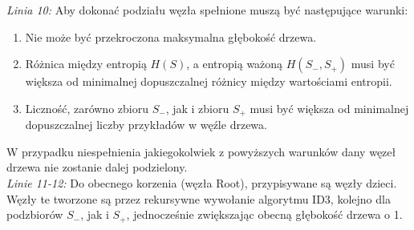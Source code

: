 \documentclass[
    left=2.5cm,         %
    right=2.5cm,        %
    top=2.5cm,          %
    bottom=3cm,         %
    bindingoffset=6mm,  %
    nohyphenation=false %
]{eiti/eiti-report}
\begin{document}
\textit{Linia 10:}
Aby dokonać podziału węzła spełnione muszą być następujące warunki:
\begin{enumerate}
    \item Nie może być przekroczona maksymalna głębokość drzewa.
    \item Różnica między entropią $H(S)$, a entropią ważoną $H(S_{-}, S_{+})$ musi być większa od minimalnej dopuszczalnej różnicy między wartościami entropii.
    \item Liczność, zarówno zbioru $S_{-}$, jak i zbioru $S_{+}$ musi być większa od minimalnej dopuszczalnej liczby przykładów w węźle drzewa.
\end{enumerate}
W przypadku niespełnienia jakiegokolwiek z powyższych warunków dany węzeł drzewa nie zostanie dalej podzielony.\\

\textit{Linie 11-12:}
Do obecnego korzenia (węzła Root), przypisywane są węzły dzieci. Węzły te tworzone są przez rekursywne wywołanie algorytmu ID3, kolejno dla podzbiorów $S_{-}$, jak i $S_{+}$, jednocześnie zwiększając obecną głębokość drzewa o 1.
\end{document}
